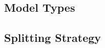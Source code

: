 \documentclass[11pt]{article}
\begin{document}
\subsection{Model Types}
\subsection{Splitting Strategy}












\newpage







%

%
%
\end{document}
